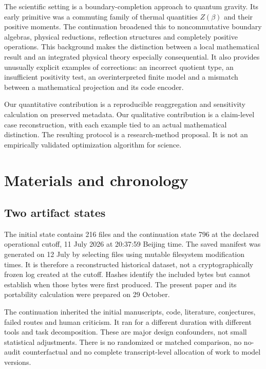 \documentclass[11pt,a4paper]{article}
\begin{document}
The scientific setting is a boundary-completion approach to quantum gravity.
Its early primitive was a commuting family of thermal quantities $Z(\beta)$
and their positive moments. The continuation broadened this to noncommutative
boundary algebras, physical reductions, reflection structures and completely
positive operations. This background makes the distinction between a local
mathematical result and an integrated physical theory especially consequential.
It also provides unusually explicit examples of corrections: an incorrect
quotient type, an insufficient positivity test, an overinterpreted finite
model and a mismatch between a mathematical projection and its code encoder.

Our quantitative contribution is a reproducible reaggregation and sensitivity
calculation on preserved metadata. Our qualitative contribution is a claim-level
case reconstruction, with each example tied to an actual mathematical
distinction. The resulting protocol is a research-method proposal. It is not
an empirically validated optimization algorithm for science.

\section{Materials and chronology}
\subsection{Two artifact states}
The initial state contains 216 files and the continuation state 796 at the
declared operational cutoff, 11 July 2026 at 20:37:59 Beijing time. The saved
manifest was generated on 12 July by selecting files using mutable filesystem
modification times. It is therefore a reconstructed historical dataset, not
a cryptographically frozen log created at the cutoff. Hashes identify the
included bytes but cannot establish when those bytes were first produced.
The present paper and its portability calculation were prepared on 29 October.

The continuation inherited the initial manuscripts, code, literature,
conjectures, failed routes and human criticism. It ran for a different duration
with different tools and task decomposition. These are major design
confounders, not small statistical adjustments. There is no randomized or
matched comparison, no no-audit counterfactual and no complete transcript-level
allocation of work to model versions.
\end{document}
